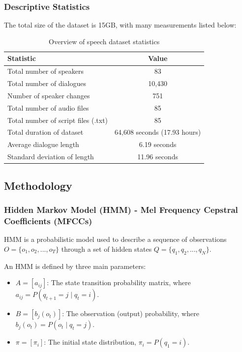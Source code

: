 \documentclass[conference]{IEEEtran}
\begin{document}
\subsubsection{Descriptive Statistics}
The total size of the dataset is 15GB, with many measurements listed below:
\begin{table}[h]
    \centering
    \caption{Overview of speech dataset statistics}
    \begin{tabular}{|l|c|}
        \hline
        \textbf{Statistic}                  & \textbf{Value}               \\
        \hline
        Total number of speakers            & 83                           \\
        Total number of dialogues           & 10,430                       \\
        Number of speaker changes           & 751                          \\
        Total number of audio files         & 85                           \\
        Total number of script files (.txt) & 85                           \\
        Total duration of dataset           & 64,608 seconds (17.93 hours) \\
        Average dialogue length             & 6.19 seconds                 \\
        Standard deviation of length        & 11.96 seconds                \\
        \hline
    \end{tabular}
\end{table}
\subsection{Methodology}
\subsubsection{Hidden Markov Model (HMM) - Mel Frequency Cepstral Coefficients (MFCCs)}
HMM is a probabilistic model used to describe a sequence of observations $O = \{o_1, o_2, ..., o_T\}$ through a set of hidden states $Q = \{q_1, q_2, ..., q_N\}$.

An HMM is defined by three main parameters:
\begin{itemize}
    \item $A = [a_{ij}]$: The state transition probability matrix, where $a_{ij} = P(q_{t+1} = j \mid q_t = i)$.
    \item $B = [b_j(o_t)]$: The observation (output) probability, where $b_j(o_t) = P(o_t \mid q_t = j)$.
    \item $\pi = [\pi_i]$: The initial state distribution, $\pi_i = P(q_1 = i)$.
\end{itemize}
\end{document}
